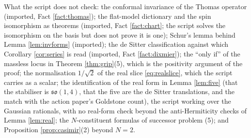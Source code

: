 \documentclass[11pt]{article}
\theoremstyle{definition}
\begin{document}
What the script does not check: the conformal invariance of the Thomas operator (imported, Fact \ref{fact:thomas}); the flat-model dictionary and the spin isomorphism as theorems (imported, Fact \ref{fact:chart}; the script solves the isomorphism on the basis but does not prove it is one); Schur's lemma behind Lemma \ref{lem:invforms} (imported); the de Sitter classification against which Corollary \ref{cor:series} is read (imported, Fact \ref{fact:dixmier}); the ``only if'' of the massless locus in Theorem \ref{thm:grip}(5), which is the positivity argument of the proof; the normalisation $1/\sqrt2$ of the real slice \eqref{eq:realslice}, which the script carries as a scalar; the identification of the real form in Lemma \ref{lem:five} (that the stabiliser is $\mathfrak{so}(1,4)$, that the five are the de Sitter translations, and the match with the action paper's Goldstone count), the script working over the Gaussian rationals, with no real-form check beyond the anti-Hermiticity checks of Lemma \ref{lem:real}; the $N$-constituent formulas of successor problem (5); and Proposition \ref{prop:casimir}(2) beyond $N = 2$.
\end{document}
